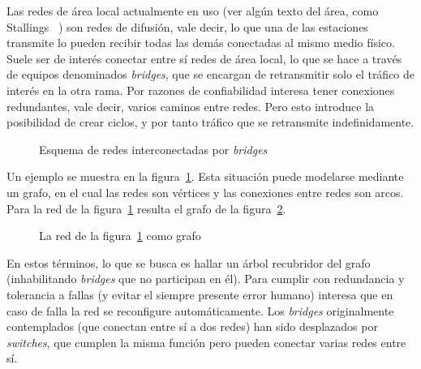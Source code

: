   Las redes de área local actualmente en uso
  (ver algún texto del área,
   como Stallings~%
     \cite{stallings10:_data_comput_commun,
	   tanenbaum10:_comput_networ})
  son redes de difusión,
  vale decir,
  lo que una de las estaciones transmite
  lo pueden recibir todas las demás conectadas
  al mismo medio físico.
  Suele ser de interés conectar entre sí redes de área local,
  lo que se hace a través de equipos
  denominados \emph{\foreignlanguage{english}{bridges}},%
  que se encargan de retransmitir
  solo el tráfico de interés en la otra rama.
  Por razones de confiabilidad
  interesa tener conexiones redundantes,
  vale decir,
  varios caminos entre redes.
  Pero esto introduce la posibilidad de crear ciclos,
  y por tanto tráfico que se retransmite indefinidamente.
  \begin{figure}[htbp]
    \centering
    \caption{Esquema de redes interconectadas por \emph{bridges}}
    \label{fig:red-esquema}
  \end{figure}
  Un ejemplo se muestra en la figura~\ref{fig:red-esquema}.
  Esta situación puede modelarse mediante un grafo,
  en el cual las redes son vértices
  y las conexiones entre redes son arcos.
  Para la red de la figura~\ref{fig:red-esquema}
  resulta el grafo de la figura~\ref{fig:red-grafo}.
  \begin{figure}[htbp]
    \centering
    \caption{La red de la figura~\ref{fig:red-esquema} como grafo}
    \label{fig:red-grafo}
  \end{figure}
  En estos términos,
  lo que se busca es hallar un árbol recubridor del grafo
  (inhabilitando \emph{\foreignlanguage{english}{bridges}}
   que no participan en él).
  Para cumplir con redundancia y tolerancia a fallas
  (y evitar el siempre presente error humano)
  interesa que en caso de falla
  la red se reconfigure automáticamente.
  Los \emph{\foreignlanguage{english}{bridges}}
  originalmente contemplados
  (que conectan entre sí a dos redes)
  han sido desplazados
  por \emph{\foreignlanguage{english}{switches}},
  que cumplen la misma función
  pero pueden conectar varias redes entre sí.

